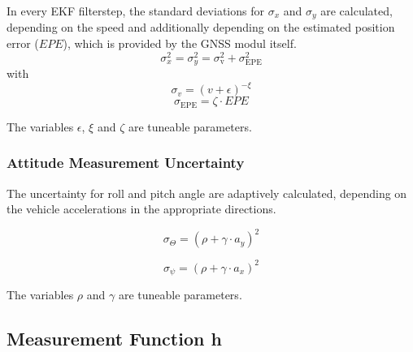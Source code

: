 \documentclass[conference]{IEEEtran}
\begin{document}
In every EKF filterstep, the standard deviations for $\sigma_x$ and $\sigma_y$ are calculated, depending on the speed and additionally depending on the estimated position error ($EPE$), which is provided by the GNSS modul itself.
\begin{equation}\sigma_x^2 = \sigma_y^2 = \sigma_\text{v}^2 + \sigma_\text{EPE}^2\end{equation}
with
\begin{equation}\label{sigmav}\sigma_v = (v+\epsilon)^{-\xi}\end{equation}
\begin{equation}\label{sigmaepe}\sigma_\text{EPE} = \zeta \cdot EPE\end{equation}

The variables $\epsilon$, $\xi$ and $\zeta$ are tuneable parameters.

\subsubsection{Attitude Measurement Uncertainty}

The uncertainty for roll and pitch angle are adaptively calculated, depending on the vehicle accelerations in the appropriate directions.

\begin{equation}\label{sigmaroll}\sigma_\Theta=\left(\rho+\gamma\cdot a_y\right)^2\end{equation}

\begin{equation}\label{sigmapitch}\sigma_\psi=\left(\rho+\gamma\cdot a_x\right)^2\end{equation}

The variables $\rho$ and $\gamma$ are tuneable parameters.

\subsection{Measurement Function h}
\end{document}
